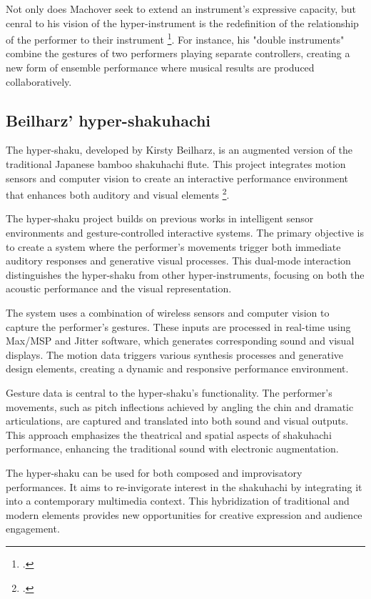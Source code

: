 \documentclass[12pt,twoside,maitrise]{dms_ks}
\theoremstyle{definition}
\begin{document}
Not only does Machover seek to extend an instrument's expressive capacity, but cenral to his vision of the hyper-instrument is the redefinition of the relationship of the performer to their instrument \footcite{hoffman_q_2010}. 
For instance, his "double instruments" combine the gestures of two performers playing separate controllers, creating a new form of ensemble performance where musical results are produced collaboratively.

\subsection{Beilharz' hyper-shakuhachi}

The hyper-shaku, developed by Kirsty Beilharz, is an augmented version of the traditional Japanese bamboo shakuhachi flute. 
This project integrates motion sensors and computer vision to create an interactive performance environment that enhances both auditory and visual elements \footcite{beilharz_hyper-shaku_2006}. 

The hyper-shaku project builds on previous works in intelligent sensor environments and gesture-controlled interactive systems. 
The primary objective is to create a system where the performer's movements trigger both immediate auditory responses and generative visual processes. 
This dual-mode interaction distinguishes the hyper-shaku from other hyper-instruments, focusing on both the acoustic performance and the visual representation.

The system uses a combination of wireless sensors and computer vision to capture the performer's gestures. 
These inputs are processed in real-time using Max/MSP and Jitter software, which generates corresponding sound and visual displays. 
The motion data triggers various synthesis processes and generative design elements, creating a dynamic and responsive performance environment.

Gesture data is central to the hyper-shaku's functionality. 
The performer's movements, such as pitch inflections achieved by angling the chin and dramatic articulations, are captured and translated into both sound and visual outputs. 
This approach emphasizes the theatrical and spatial aspects of shakuhachi performance, enhancing the traditional sound with electronic augmentation.

The hyper-shaku can be used for both composed and improvisatory performances. 
It aims to re-invigorate interest in the shakuhachi by integrating it into a contemporary multimedia context. 
This hybridization of traditional and modern elements provides new opportunities for creative expression and audience engagement.
\end{document}
